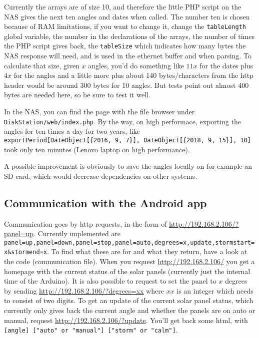 \documentclass{article}
\begin{document}
			Currently the arrays are of size 10, and therefore the little PHP script on the NAS gives the next ten angles and dates when called. The number ten is chosen because of RAM limitations, if you want to change it, change the \verb|tableLength| global variable, the number in the declarations of the arrays, the number of times the PHP script gives back, the \verb|tableSize| which indicates how many bytes the NAS response will need, and is used in the ethernet buffer and when parsing. To calculate that size, given $x$ angles, you'd do something like $11x$ for the dates plus $4x$ for the angles and a little more plus about 140 bytes/characters from the http header would be around 300 bytes for 10 angles. But tests point out almost 400 bytes are needed here, so be sure to test it well. 
			
			In the NAS, you can find the page with the file browser under \verb|DiskStation/web/index.php|.
			By the way, on high performace, exporting the angles for ten times a day for two years, like \\ \verb|exportPeriod[DateObject[{2016, 9, 7}], DateObject[{2018, 9, 15}], 10]| took only ten minutes (Lenovo laptop on high performance).
			
			A possible improvement is obviously to save the angles locally on for example an SD card, which would decrease dependencies on other systems.
			
		\subsection{Communication with the Android app} \label{arduinoToAndroid}
			Communication goes by http requests, in the form of \url{http://192.168.2.106/?panel=up}. Currently implemented are \verb|panel=up,panel=down,panel=stop,panel=auto,degrees=x,update,stormstart=x&stormend=x|. To find what these are for and what they return, have a look at the code (communication file). When you request \url{http://192.168.2.106/} you get a homepage with the current status of the solar panels (currently just the internal time of the Arduino). It is also possible to request to set the panel to $x$ degrees by sending \url{http://192.168.2.106/?degrees=xx} where $xx$ is an integer which needs to consist of two digits. To get an update of the current solar panel status, which currently only gives back the current angle and whether the panels are on auto or manual, request \url{http://192.168.2.106/?update}. You'll get back some html, with \verb|[angle] ["auto" or "manual"] ["storm" or "calm"]|.
			
\end{document}
